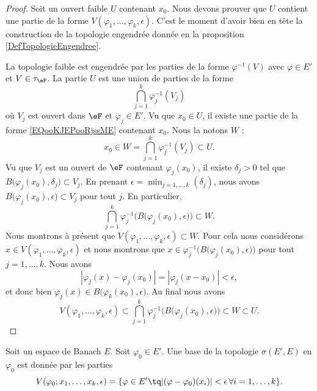 \begin{proof}
	Soit un ouvert faible \( U\) contenant \( x_0\). Nous devons prouver que \( U\) contient une partie de la forme \( V(\varphi_1,\ldots, \varphi_k,\epsilon)\). C'est le moment d'avoir bien en tête la construction de la topologie engendrée donnée en la proposition \ref{DefTopologieEngendree}.

	La topologie faible est engendrée par les parties de la forme \( \varphi^{-1}(V)\) avec \( \varphi\in E'\) et \( V\in \tau_{\eF}\). La partie \( U\) est une union de parties de la forme
	\begin{equation}        \label{EQooKJEPooRjssME}
		\bigcap_{j=1}^k\varphi_j^{-1}(V_j)
	\end{equation}
	où \( V_j\) est ouvert dans \( \eF\) et \( \varphi_j\in E'\). Vu que \( x_0\in U\), il existe une partie de la forme \eqref{EQooKJEPooRjssME} contenant \( x_0\). Nous la notons \( W\) :
	\begin{equation}
		x_0\in W=\bigcap_{j=1}^k\varphi_j^{-1}(V_j)\subset U.
	\end{equation}
	Vu que \( V_j\) est un ouvert de \( \eF\) contenant \( \varphi_j(x_0)\), il existe \( \delta_j>0\) tel que \( B\big( \varphi_j(x_0),\delta_j \big)\subset V_j\). En prenant \( \epsilon=\min_{j=1,\ldots, k}(\delta_j)\), nous avons \( B\big( \varphi_j(x_0),\epsilon \big)\subset V_j\) pour tout \( j\). En particulier,
	\begin{equation}
		\bigcap_{j=1}^k\varphi_j^{-1}\Big( B\big(\varphi_j(x_0),\epsilon\big) \Big)\subset W.
	\end{equation}
	Nous montrons à présent que \( V(\varphi_1,\ldots, \varphi_k,\epsilon)\subset W\). Pour cela nous considérons \( x\in V(\varphi_1,\ldots, \varphi_k,\epsilon)\) et nous montrons que \( x\in\varphi_j^{-1}\Big( B\big( \varphi_j(x_0),\epsilon \big) \Big)\) pour tout \( j=1,\ldots, k\). Nous avons
	\begin{equation}
		| \varphi_j(x)-\varphi_j(x_0) |=| \varphi_j(x-x_0) |<\epsilon,
	\end{equation}
	et donc bien \( \varphi_j(x)\in B\big( \varphi_k(x_0),\epsilon \big)\). Au final nous avons
	\begin{equation}
		V(\varphi_1,\ldots, \varphi_k,\epsilon)\subset\bigcap_{j=1}^k\varphi_j^{-1}\Big( B\big( \varphi_j(x_0),\epsilon \big) \Big)\subset W\subset U.
	\end{equation}
\end{proof}

\begin{proposition}	\label{PROPooMBOJooQcwyuv}
	Soit un espace de Banach \( E\). Soit \( \varphi_0\in E'\). Une base de la topologie \( \sigma(E',E)\) en \( \varphi_0\) est donnée par les parties
	\begin{equation}		\label{EQooTINIooJulDll}
		V(\varphi_0;x_1,\ldots,x_k,\epsilon)=\{ \varphi\in E'\tq | (\varphi-\varphi_0)(x_i) |<\epsilon\,\forall i=1,\ldots,k \}.
	\end{equation}
\end{proposition}

